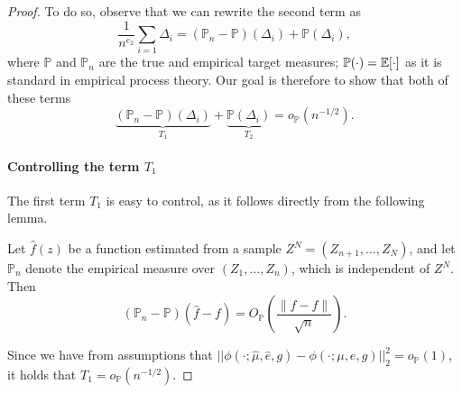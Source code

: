 \begin{proof}
To do so, observe that we can rewrite the second term as
$$
\frac{1}{n^{e_2}} \sum_{i=1} \Delta_i = (\mathbb P_n - \mathbb P)(\Delta_i) + \mathbb P(\Delta_i),
$$
where $\mathbb P$ and $\mathbb P_n$ are the true and empirical target measures; $\mathbb P(\cdot) = \mathbb{E}[\cdot]$ as it is standard in empirical process theory.
Our goal is therefore to show that both of these terms 
$$
\underbrace{(\mathbb P_n- \mathbb P)(\Delta_i)}_{T_1} + \underbrace{\mathbb P(\Delta_i)}_{T_2} = o_{\mathbb P}(n^{-1/2}).
$$
\paragraph{Controlling the term $T_1$}The first term $T_1$ is easy to control, as it follows directly from the following lemma.

\begin{lemma} \label{lemma:kennedy} \citep{kennedy2020sharp}
Let $\widehat{f}(z)$ be a function estimated from a sample $Z^N = (Z_{n+1}, \ldots, Z_N)$, and let $\mathbb{P}_n$ denote the empirical measure over $(Z_1, \ldots, Z_n)$, which is independent of $Z^N$. Then
\[
(\mathbb{P}_n - \mathbb{P})(\widehat{f} - f) = O_{\mathbb{P}} \left(\frac{\|\widehat{f} - f\|}{\sqrt{n}}\right).
\]
\end{lemma}
Since we have from assumptions that $||\phi(\cdot;\hat \mu,  \hat e, g) -\phi(\cdot;\mu, e,  g)  ||_2^2=o_{\mathbb P}(1)$, it holds that $T_1 = o_{\mathbb P}(n^{-1/2}).$ 



\end{proof}
